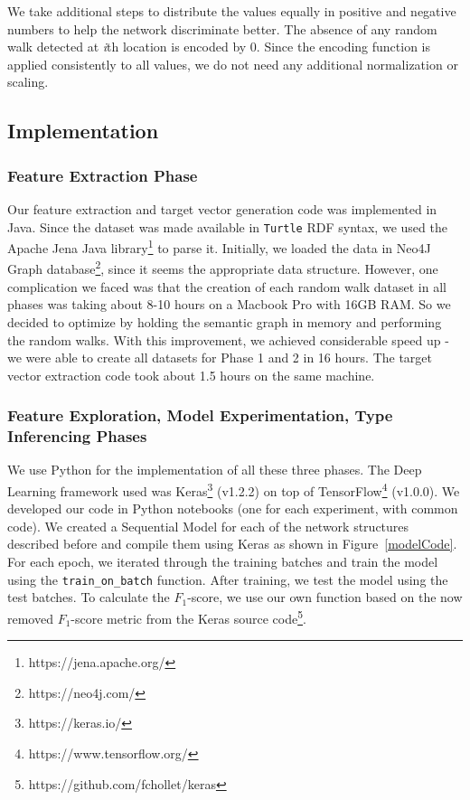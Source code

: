 \documentclass[runningheads,a4paper]{IEEEtran}
\begin{document}
We take additional steps to distribute the values equally in positive and negative numbers to help the network discriminate better. The absence of any random walk detected at \textit{i}th location is encoded by 0.  Since the encoding function is applied consistently to all values, we do not need any additional normalization or scaling.

\subsection{Implementation}
\label{implementation}

\subsubsection{Feature Extraction Phase}
Our feature extraction and target vector generation code was implemented in Java. Since the dataset was made available in \texttt{Turtle} RDF syntax, we used the Apache Jena Java library\footnote{https://jena.apache.org/} to parse it. Initially, we loaded the data in Neo4J Graph database\footnote{https://neo4j.com/}, since it seems the appropriate data structure. However, one complication we faced was that the creation of each random walk dataset in all phases was taking about 8-10 hours on a Macbook Pro with 16GB RAM. So we decided to optimize by holding the semantic graph in memory and performing the random walks. With this improvement, we achieved considerable speed up - we were able to create all datasets for Phase 1 and 2 in 16 hours. The target vector extraction code took about 1.5 hours on the same machine. 

\subsubsection{Feature Exploration, Model Experimentation, Type Inferencing Phases}
We use Python for the implementation of all these three phases. The Deep Learning framework used was Keras\footnote{https://keras.io/} (v1.2.2) on top of TensorFlow\footnote{https://www.tensorflow.org/} (v1.0.0). 
We developed our code in Python notebooks (one for each experiment, with common code). We created a Sequential Model for each of the network structures described before and compile them using Keras as shown in Figure~\ref{modelCode}. For each epoch, we iterated through the training batches and train the model using the \texttt{train\_on\_batch} function. After training, we test the model using the test batches. To calculate the $F_1$-score, we use our own function based on the now removed $F_1$-score metric from the Keras source code\footnote{https://github.com/fchollet/keras}. 
\end{document}
